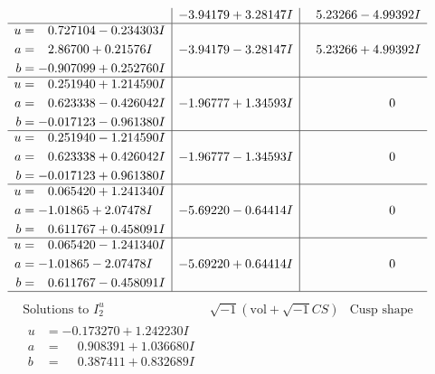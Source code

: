 \documentclass[1p]{elsarticle_modified}
\theoremstyle{definition}
\newcommand{\I}{\sqrt{-1}}
\begin{document}
$$\begin{array}{c|c|c}
 & -3.94179 + 3.28147 I & \phantom{-}5.23266 - 4.99392 I \\ \hline\begin{aligned}
u &= \phantom{-}0.727104 - 0.234303 I \\
a &= \phantom{-}2.86700 + 0.21576 I \\
b &= -0.907099 + 0.252760 I\end{aligned}
 & -3.94179 - 3.28147 I & \phantom{-}5.23266 + 4.99392 I \\ \hline\begin{aligned}
u &= \phantom{-}0.251940 + 1.214590 I \\
a &= \phantom{-}0.623338 - 0.426042 I \\
b &= -0.017123 - 0.961380 I\end{aligned}
 & -1.96777 + 1.34593 I & \phantom{-0.000000 } 0 \\ \hline\begin{aligned}
u &= \phantom{-}0.251940 - 1.214590 I \\
a &= \phantom{-}0.623338 + 0.426042 I \\
b &= -0.017123 + 0.961380 I\end{aligned}
 & -1.96777 - 1.34593 I & \phantom{-0.000000 } 0 \\ \hline\begin{aligned}
u &= \phantom{-}0.065420 + 1.241340 I \\
a &= -1.01865 + 2.07478 I \\
b &= \phantom{-}0.611767 + 0.458091 I\end{aligned}
 & -5.69220 - 0.64414 I & \phantom{-0.000000 } 0 \\ \hline\begin{aligned}
u &= \phantom{-}0.065420 - 1.241340 I \\
a &= -1.01865 - 2.07478 I \\
b &= \phantom{-}0.611767 - 0.458091 I\end{aligned}
 & -5.69220 + 0.64414 I & \phantom{-0.000000 } 0\\
 \hline 
 \end{array}$$\newpage$$\begin{array}{c|c|c}  
\text{Solutions to }I^u_{2}& \I (\text{vol} + \sqrt{-1}CS) & \text{Cusp shape}\\
 \hline 
\begin{aligned}
u &= -0.173270 + 1.242230 I \\
a &= \phantom{-}0.908391 + 1.036680 I \\
b &= \phantom{-}0.387411 + 0.832689 I\end{aligned}

\end{array}$$
\end{document}
